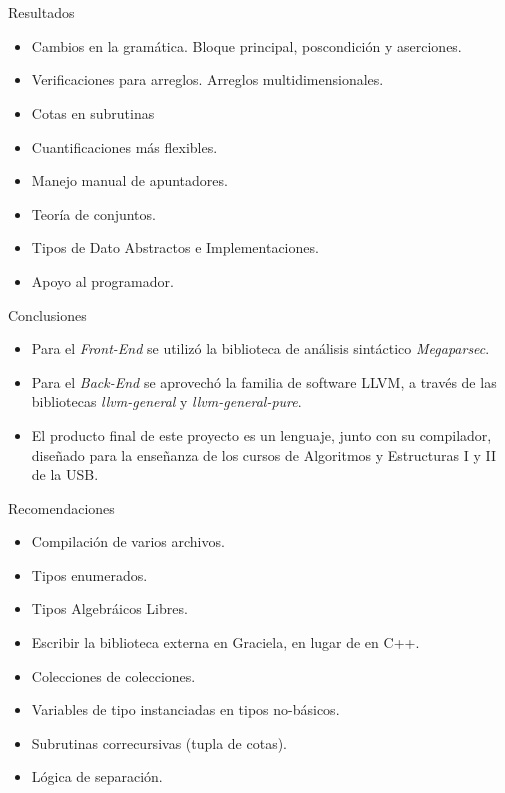 \section{ }

\begin{frame}{Resultados}
\begin{itemize}
  \item Cambios en la gramática. Bloque principal, poscondición y aserciones.
  \item Verificaciones para arreglos. Arreglos multidimensionales.
  \item Cotas en subrutinas
  \item Cuantificaciones más flexibles.
  \item Manejo manual de apuntadores.
  \item Teoría de conjuntos.
  \item Tipos de Dato Abstractos e Implementaciones.
  \item Apoyo al programador.
\end{itemize}
\end{frame}

\begin{frame}{Conclusiones}
\begin{itemize}
  \item Para el \textit{Front-End} se utilizó la biblioteca de análisis sintáctico \textit{Megaparsec}.
  \item Para el \textit{Back-End}
  se aprovechó la familia de software LLVM, a través de las bibliotecas \textit{llvm-general} y \textit{llvm-general-pure}.
  \item El producto final de este proyecto es un lenguaje, junto con su compilador, diseñado para la enseñanza de los cursos de Algoritmos y Estructuras I y II de la USB.
\end{itemize}
\end{frame}

\begin{frame}{Recomendaciones}
\begin{itemize}
  \item Compilación de varios archivos.
  \item Tipos enumerados.
  \item Tipos Algebráicos Libres.
  \item Escribir la biblioteca externa en Graciela, en lugar de en C++.
  \item Colecciones de colecciones.
  \item Variables de tipo instanciadas en tipos no-básicos.
  \item Subrutinas correcursivas (tupla de cotas).
  \item Lógica de separación.
\end{itemize}
\end{frame}
